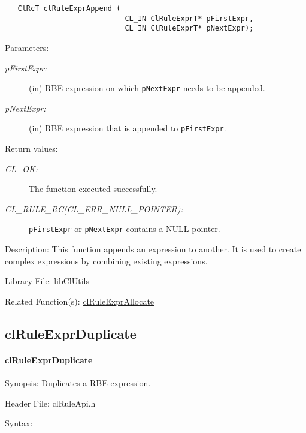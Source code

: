 \begin{flushleft}
\begin{Desc}
\footnotesize\begin{verbatim}   ClRcT clRuleExprAppend (
              				CL_IN ClRuleExprT* pFirstExpr,
              				CL_IN ClRuleExprT* pNextExpr);
\end{verbatim}
\normalsize
\end{Desc}
\begin{Desc}
\item[Parameters:]
\begin{description}
\item[{\em p\-First\-Expr:}](in) RBE expression on which {\tt{p\-Next\-Expr}} needs to be appended. 
\item[{\em p\-Next\-Expr:}](in) RBE expression that is appended to {\tt{p\-First\-Expr}}.\end{description}
\end{Desc}
\begin{Desc}
\item[Return values:]
\begin{description}
\item[{\em CL\_\-OK:}]The function executed successfully. 
\item[{\em CL\_\-RULE\_\-RC(CL\_\-ERR\_\-NULL\_\-POINTER):}]{\tt{pFirstExpr}} or {\tt{pNextExpr}} contains a NULL pointer.
\end{description}
\end{Desc}
\begin{Desc}
\item[Description:]This function appends an expression to another. It is used to create complex expressions by combining existing expressions.\end{Desc}
\begin{Desc}
\item[Library File:]lib\-Cl\-Utils\end{Desc}
\begin{Desc}
\item[Related Function(s):]\hyperlink{pagerule101}{cl\-Rule\-Expr\-Allocate} \end{Desc}
\newpage


\subsection{clRuleExprDuplicate}
\hypertarget{pagerule104}{}\paragraph{cl\-Rule\-Expr\-Duplicate}\label{pagerule104}
\begin{Desc}
\item[Synopsis:]Duplicates a RBE expression.\end{Desc}
\begin{Desc}
\item[Header File:]clRuleApi.h\end{Desc}
\begin{Desc}
\item[Syntax:]


\end{Desc}
\end{flushleft}
